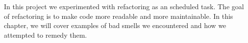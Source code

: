 In this project we experimented with refactoring as an scheduled task. The goal of refactoring is to make code more readable and more maintainable. In this chapter, we will cover examples of bad smells we encountered and how we attempted to remedy them.